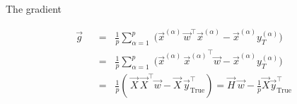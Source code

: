 \begin{frame}{The gradient}


\begin{align}
\vec g
\;\;&=\;\;
\frac{1}{p} \sum_{\alpha=1}^{p} \;
\big( \vec x^{(\alpha)} \, \vec w^{\top}\vec x^{(\alpha)} - \vec x^{(\alpha)} y_{T}^{(\alpha)} \big)\\
\;\;&=\;\;
\frac{1}{p} \sum_{\alpha=1}^{p} \;
\big( \vec x^{(\alpha)} \, {\vec x^{(\alpha)}}^{\top} \vec w- \vec x^{(\alpha)} y_{T}^{(\alpha)} \big)\\
\;\;&=\;\;
\frac{1}{p} \left(\, \vec X \, \vec X^\top \vec w - \vec X\, \vec y_{\text{True}}^\top \right) =  \vec H~\vec w - \frac{1}{p} \vec X \vec y_{\text{True}}^\top
\end{align}

\end{frame}

